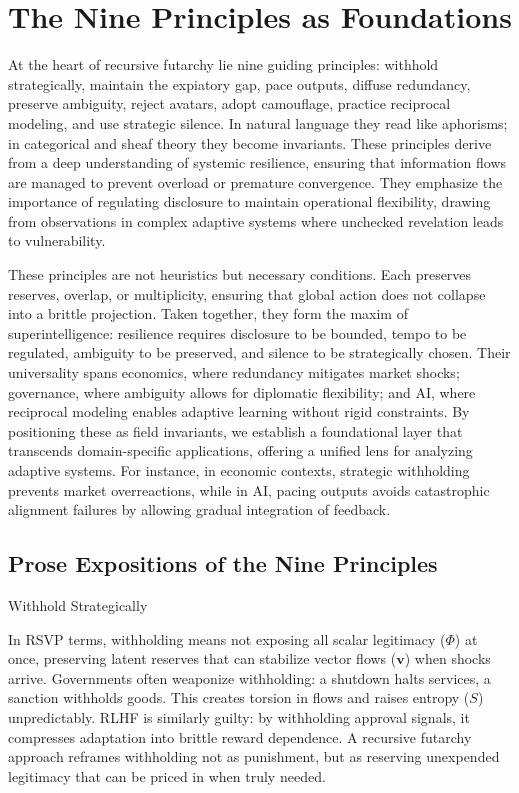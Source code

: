 \documentclass{article}
\begin{document}
\section{The Nine Principles as Foundations}

At the heart of recursive futarchy lie nine guiding principles: withhold strategically, maintain the expiatory gap, pace outputs, diffuse redundancy, preserve ambiguity, reject avatars, adopt camouflage, practice reciprocal modeling, and use strategic silence. In natural language they read like aphorisms; in categorical and sheaf theory they become invariants. These principles derive from a deep understanding of systemic resilience, ensuring that information flows are managed to prevent overload or premature convergence. They emphasize the importance of regulating disclosure to maintain operational flexibility, drawing from observations in complex adaptive systems where unchecked revelation leads to vulnerability.

These principles are not heuristics but necessary conditions. Each preserves reserves, overlap, or multiplicity, ensuring that global action does not collapse into a brittle projection. Taken together, they form the maxim of superintelligence: resilience requires disclosure to be bounded, tempo to be regulated, ambiguity to be preserved, and silence to be strategically chosen. Their universality spans economics, where redundancy mitigates market shocks; governance, where ambiguity allows for diplomatic flexibility; and AI, where reciprocal modeling enables adaptive learning without rigid constraints. By positioning these as field invariants, we establish a foundational layer that transcends domain-specific applications, offering a unified lens for analyzing adaptive systems. For instance, in economic contexts, strategic withholding prevents market overreactions, while in AI, pacing outputs avoids catastrophic alignment failures by allowing gradual integration of feedback.

\subsection{Prose Expositions of the Nine Principles}

Withhold Strategically

In RSVP terms, withholding means not exposing all scalar legitimacy ($\Phi$) at once, preserving latent reserves that can stabilize vector flows ($\mathbf{v}$) when shocks arrive. Governments often weaponize withholding: a shutdown halts services, a sanction withholds goods. This creates torsion in flows and raises entropy ($S$) unpredictably. RLHF is similarly guilty: by withholding approval signals, it compresses adaptation into brittle reward dependence. A recursive futarchy approach reframes withholding not as punishment, but as reserving unexpended legitimacy that can be priced in when truly needed.
\end{document}
